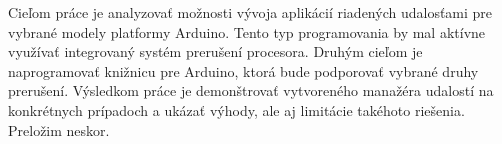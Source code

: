 Cieľom práce je analyzovať možnosti vývoja aplikácií riadených udalosťami pre vybrané modely platformy Arduino. Tento typ programovania by mal aktívne využívať integrovaný systém prerušení procesora. Druhým cieľom je naprogramovať knižnicu pre Arduino, ktorá bude podporovať vybrané druhy prerušení. Výsledkom práce je demonštrovať vytvoreného manažéra udalostí na konkrétnych prípadoch a ukázať výhody, ale aj limitácie takéhoto riešenia.
Preložim neskor.